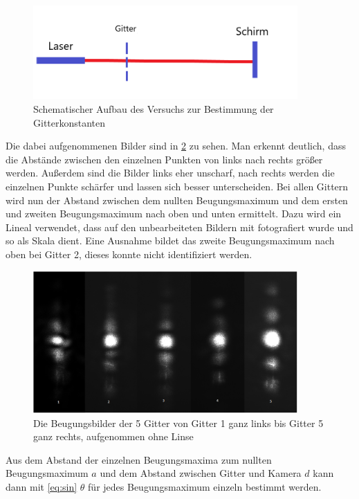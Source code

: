 \begin{figure}[h]
	\centering
	\includegraphics[width=0.9\textwidth]{Lana-Bild2.png}
	\caption{Schematischer Aufbau des Versuchs zur Bestimmung der Gitterkonstanten}
	\label{aufbaugitter}
\end{figure}

Die dabei aufgenommenen Bilder sind in \cref{gitterfernfeld} zu sehen. Man erkennt deutlich, dass die Abstände zwischen den einzelnen Punkten von links nach rechts größer werden. Außerdem sind die Bilder links eher unscharf, nach rechts werden die einzelnen Punkte schärfer und lassen sich besser unterscheiden. Bei allen Gittern wird nun der Abstand zwischen dem nullten Beugungsmaximum und dem ersten und zweiten Beugungsmaximum nach oben und unten ermittelt. Dazu wird ein Lineal verwendet, dass auf den unbearbeiteten Bildern mit fotografiert wurde und so als Skala dient. Eine Ausnahme bildet das zweite Beugungsmaximum nach oben bei Gitter 2, dieses konnte nicht identifiziert werden. 

\begin{figure}
	\centering
	\includegraphics[width=0.9\textwidth]{gitter_fernfeld.png}
	\caption{Die Beugungsbilder der 5 Gitter von Gitter 1 ganz links bis Gitter 5 ganz rechts, aufgenommen ohne Linse}
	\label{gitterfernfeld}
\end{figure}

Aus dem Abstand der einzelnen Beugungsmaxima zum nullten Beugungsmaximum $a$ und dem Abstand zwischen Gitter und Kamera $d$ kann dann mit \cref{eq:sin} $\theta$ für jedes Beugungsmaximum einzeln bestimmt werden.

